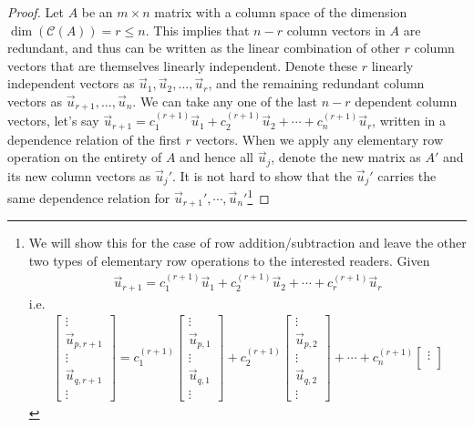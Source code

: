 \begin{proof}
Let $A$ be an $m \times n$ matrix with a column space of the dimension $\dim(\mathcal{C}(A)) = r \leq n$. This implies that $n-r$ column vectors in $A$ are redundant, and thus can be written as the linear combination of other $r$ column vectors that are themselves linearly independent. Denote these $r$ linearly independent vectors as $\vec{u}_1, \vec{u}_2, \ldots, \vec{u}_r$, and the remaining redundant column vectors as $\vec{u}_{r+1}, \ldots, \vec{u}_n$. We can take any one of the last $n-r$ dependent column vectors, let's say $\vec{u}_{r+1} = c_1^{(r+1)}\vec{u}_1 + c_2^{(r+1)}\vec{u}_2 + \cdots + c_n^{(r+1)}\vec{u}_r$, written in a dependence relation of the first $r$ vectors. When we apply any elementary row operation on the entirety of $A$ and hence all $\vec{u}_j$, denote the new matrix as $A'$ and its new column vectors as $\vec{u}_j'$. It is not hard to show that the $\vec{u}_j'$ carries the same dependence relation for $\vec{u}_{r+1}', \cdots, \vec{u}_n'$\footnote{We will show this for the case of row addition/subtraction and leave the other two types of elementary row operations to the interested readers. Given \begin{align*}
\vec{u}_{r+1} = c_1^{(r+1)}\vec{u}_1 + c_2^{(r+1)}\vec{u}_2 + \cdots + c_r^{(r+1)}\vec{u}_r
\end{align*}i.e.
\begin{align*}
\begin{bmatrix}
\vdots \\
\vec{u}_{p, r+1} \\
\vdots \\
\vec{u}_{q, r+1} \\
\vdots
\end{bmatrix}
= c_1^{(r+1)}
\begin{bmatrix}
\vdots \\
\vec{u}_{p, 1} \\
\vdots \\
\vec{u}_{q, 1} \\
\vdots
\end{bmatrix}
+ c_2^{(r+1)}
\begin{bmatrix}
\vdots \\
\vec{u}_{p, 2} \\
\vdots \\
\vec{u}_{q, 2} \\
\vdots
\end{bmatrix} + \cdots + 
c_n^{(r+1)}
\begin{bmatrix}
\vdots \\

\end{bmatrix}
\end{align*}}
\end{proof}
